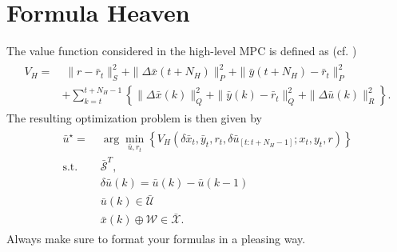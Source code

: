 \section{Formula Heaven}
The value function considered in the high-level MPC is defined as (cf. \cite{Betti2013})
\begin{align}
\begin{split}
V_{H}=&\;\|r-\bar{r}_{t}\|^{2}_{S}+\|\Delta\bar{x}(t+N_{H})\|^{2}_{P}+\|\bar{y}(t+N_{H})-\bar{r}_{t}\|^{2}_{P}\\&
+\sum_{k=t}^{t+N_{H}-1}\left\{\|\Delta\bar{x}(k)\|^{2}_{Q}+\|\bar{y}(k)-\bar{r}_{t}\|^{2}_{Q}+\|\Delta\bar{u}(k)\|^{2}_{R}\right\}.
\end{split}
\end{align}
The resulting optimization problem is then given by
\begin{align}
\begin{split}
\bar{u}^{\star} = &\;\arg\underset{\bar{u}, r_{t}}{\min}\left\{V_{H}(\delta\bar{x}_{t}, \bar{y}_{t}, r_{t}, \delta\bar{u}_{[t:t+N_{H}-1]}; x_{t}, y_{t}, r)\right\}\\
\text{s.t.}\;&\;\bar{\mathcal{S}}^{T},\\
&\;\delta\bar{u}(k)=\bar{u}(k)-\bar{u}(k-1)\\
&\;\bar{u}(k)\in\bar{\mathcal{U}}\\
&\;\bar{x}(k)\oplus\mathcal{W}\in\bar{\mathcal{X}}.
\end{split}
\end{align}
Always make sure to format your formulas in a pleasing way.


